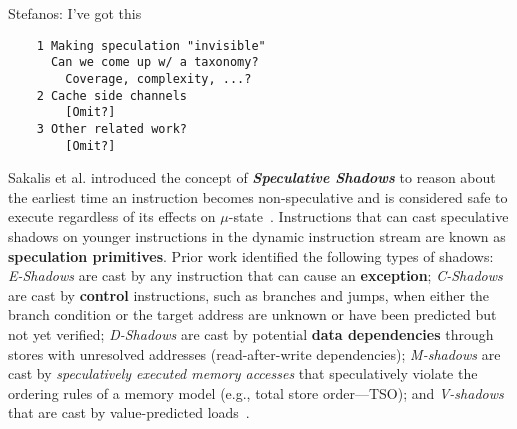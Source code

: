 {\color{red} Stefanos: I've got this}
\begin{verbatim}
    1 Making speculation "invisible"
      Can we come up w/ a taxonomy?
        Coverage, complexity, ...?
    2 Cache side channels 
        [Omit?]
    3 Other related work?
        [Omit?]
\end{verbatim}

Sakalis et al. introduced the concept of \textbf{\emph{Speculative Shadows}} to reason about the earliest time an instruction becomes non-speculative and is considered safe to execute regardless of its effects on $\mu$-state~\cite{sakalis2019efficient}.
Instructions that can cast speculative shadows on younger instructions in the dynamic instruction stream are known as \textbf{speculation primitives}.
Prior work identified the following types of shadows: \emph{E-Shadows} are cast by any instruction that can cause an \textbf{exception}; 
\emph{C-Shadows} are cast by \textbf{control} instructions, such as branches and jumps, when either the branch condition or the target address are unknown or have been predicted but not yet verified; \emph{D-Shadows} are cast by potential \textbf{data dependencies} through stores with unresolved addresses (read-after-write dependencies); \emph{M-shadows} are cast by \emph{speculatively executed memory accesses} that speculatively violate the ordering rules of a memory model (e.g., total store order---TSO); and \emph{V-shadows} that are cast by value-predicted loads~\cite{sakalis2019efficient}.

